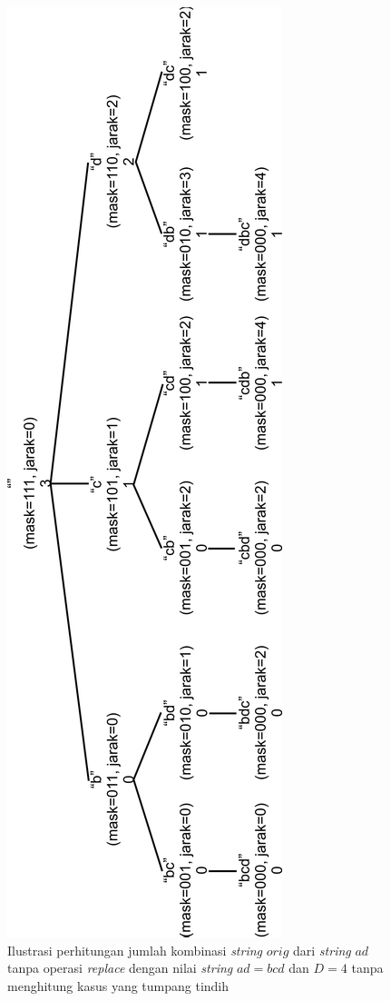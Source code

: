 \begin{figure}
	\centerline{ \includegraphics[scale=0.3]{assets/images/new/jpg/subproblem1-optimal-rotated.jpg}}
		\caption{Ilustrasi perhitungan jumlah kombinasi \textit{string} $ orig $ dari \textit{string} $ ad $ tanpa operasi \textit{replace} dengan nilai \textit{string} $ ad = bcd $ dan $ D=4 $ tanpa menghitung kasus yang tumpang tindih}
		\label{figure:ilustrasi_perhitungan_kombinasi_orig_tanpa_replace_optimal}
\end{figure}

